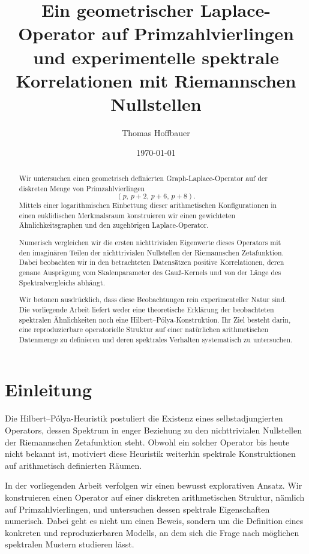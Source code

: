 \documentclass[11pt,a4paper,draft]{article}
\title{
	Ein geometrischer Laplace-Operator auf Primzahlvierlingen\\
	und experimentelle spektrale Korrelationen mit Riemannschen Nullstellen
}
\author{Thomas Hoffbauer}
\date{\today}
\begin{document}
	
	\maketitle
	
	\begin{abstract}
		Wir untersuchen einen geometrisch definierten Graph-Laplace-Operator auf der diskreten Menge von Primzahlvierlingen
		\[
		(p,\,p+2,\,p+6,\,p+8).
		\]
		Mittels einer logarithmischen Einbettung dieser arithmetischen Konfigurationen in einen euklidischen Merkmalsraum konstruieren wir einen gewichteten Ähnlichkeitsgraphen und den zugehörigen Laplace-Operator.
		
		Numerisch vergleichen wir die ersten nichttrivialen Eigenwerte dieses Operators mit den imaginären Teilen der nichttrivialen Nullstellen der Riemannschen Zetafunktion. Dabei beobachten wir in den betrachteten Datensätzen positive Korrelationen, deren genaue Ausprägung vom Skalenparameter des Gauß-Kernels und von der Länge des Spektralvergleichs abhängt.
		
		Wir betonen ausdrücklich, dass diese Beobachtungen rein experimenteller Natur sind. Die vorliegende Arbeit liefert weder eine theoretische Erklärung der beobachteten spektralen Ähnlichkeiten noch eine Hilbert--Pólya-Konstruktion. Ihr Ziel besteht darin, eine reproduzierbare operatorielle Struktur auf einer natürlichen arithmetischen Datenmenge zu definieren und deren spektrales Verhalten systematisch zu untersuchen.
	\end{abstract}
	
	\section{Einleitung}
	
	Die Hilbert--Pólya-Heuristik postuliert die Existenz eines selbstadjungierten Operators, dessen Spektrum in enger Beziehung zu den nichttrivialen Nullstellen der Riemannschen Zetafunktion steht. Obwohl ein solcher Operator bis heute nicht bekannt ist, motiviert diese Heuristik weiterhin spektrale Konstruktionen auf arithmetisch definierten Räumen.
	
	In der vorliegenden Arbeit verfolgen wir einen bewusst explorativen Ansatz. Wir konstruieren einen Operator auf einer diskreten arithmetischen Struktur, nämlich auf Primzahlvierlingen, und untersuchen dessen spektrale Eigenschaften numerisch. Dabei geht es nicht um einen Beweis, sondern um die Definition eines konkreten und reproduzierbaren Modells, an dem sich die Frage nach möglichen spektralen Mustern studieren lässt.
	
\end{document}
